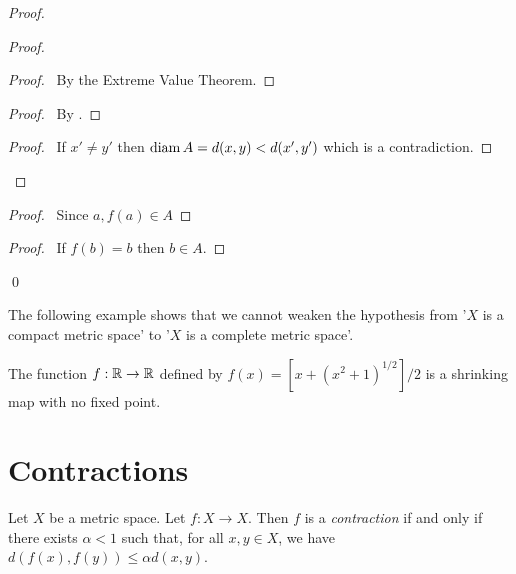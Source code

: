 \begin{proof}
    \begin{proof}
        \begin{proof}
            \pf\ By the Extreme Value Theorem.
        \end{proof}
        \begin{proof}
            \pf\ By .
        \end{proof}
        \begin{proof}
            \pf\ If $x' \neq y'$ then $\operatorname{diam} A = d(x,y) < d(x',y')$ which is
            a contradiction.
        \end{proof}
    \end{proof}
    \begin{proof}
        \pf\ Since $a, f(a) \in A$
    \end{proof}
    \begin{proof}
        \pf\ If $f(b) = b$ then $b \in A$.
    \end{proof}
    \qed
\end{proof}

The following example shows that we cannot weaken the hypothesis from '$X$ is
a compact metric space' to '$X$ is a complete metric space'.

\begin{example}
    The function $f : \mathbb{R} \rightarrow \mathbb{R}$ defined by
    $f(x) = [x + (x^2 + 1)^{1/2}] / 2$ is a shrinking map with no fixed point.
\end{example}

\section{Contractions}

\begin{definition}[Contraction]
    Let $X$ be a metric space. Let $f : X \rightarrow X$. Then $f$ is a
    \emph{contraction} if and only if there exists $\alpha < 1$ such that,
    for all $x, y \in X$, we have $d(f(x),f(y)) \leq \alpha d(x,y)$.
\end{definition}


